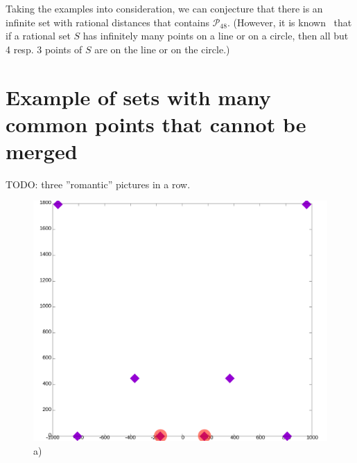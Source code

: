 \documentclass[12pt]{article}
\theoremstyle{theorem}
\theoremstyle{dfn}
\theoremstyle{remark}
\begin{document}
Taking the examples into consideration,
we can conjecture that there is an infinite set with rational distances
that contains $\mathcal{P_48}$.
(However, it is known~\cite{solymosi2010question} that
if a rational set $S$ has infinitely many points on a line or on a circle,
then all but 4 resp. 3 points of $S$ are on the line or on the circle.)


\section{Example of sets with many common points that cannot be merged}

TODO: three ''romantic'' pictures in a row.

\begin{figure}[h!]
	\begin{minipage}[h]{0.32\linewidth}
		\begin{center}
			\includegraphics[width=1\linewidth]{./img/8_2520_143_symm1.png}\\ a)
		\end{center}
	\end{minipage}
	\hfill
	\begin{minipage}[h]{0.32\linewidth}
		\begin{center}

\end{center}
\end{minipage}
\end{figure}
\end{document}
